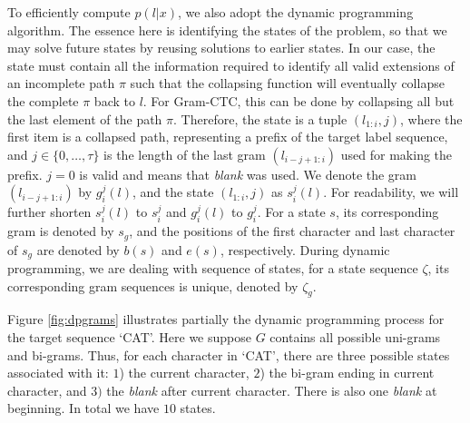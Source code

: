 \documentclass{article}
\begin{document}
To efficiently compute $p(l|x)$, we also adopt the dynamic programming algorithm. The essence here is identifying the states of the problem, so that we may solve future states by reusing solutions to earlier states. In our case, the state must contain all the information required to identify all valid extensions of an incomplete path $\pi$ such that the collapsing function will eventually collapse the complete $\pi$ back to $l$. For Gram-CTC, this can be done by collapsing all but the last element of the path $\pi$. Therefore, the state is a tuple $(l_{1:i}, j)$, where the first item is a collapsed path, representing a prefix of the target label sequence, and $j \in \{0,\ldots,\tau\}$ is the length of the last gram $(l_{i-j+1:i})$ used for making the prefix. $j=0$ is valid and means that \emph{blank} was used. We denote the gram $(l_{i-j+1:i})$ by $g_i^j(l)$, and the state $(l_{1:i}, j)$ as $s_i^j(l)$. For readability, we will further shorten $s_i^j(l)$ to $s_i^j$ and $g_i^j(l)$ to $g_i^j$. For a state $s$, its corresponding gram is denoted by $s_g$, and the positions of the first character and last character of $s_g$ are denoted by $b(s)$ and $e(s)$, respectively. During dynamic programming, we are dealing with sequence of states, for a state sequence $\zeta$, its corresponding gram sequences is unique, denoted by $\zeta_g$.

Figure \ref{fig:dpgrams} illustrates partially the dynamic programming process for the target sequence `CAT'. Here we suppose $G$ contains all possible uni-grams and bi-grams. Thus, for each character in `CAT', there are three possible states associated with it: $1$) the current character, $2$) the bi-gram ending in current character, and $3)$ the \emph{blank} after current character. There is also one \emph{blank} at beginning. In total we have $10$ states. 


\end{document}
